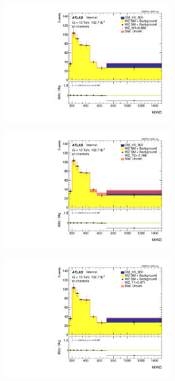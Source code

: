\documentclass[../Bachelorarbeit.tex]{subfiles}
\begin{document}
\begin{figure}[h]
\begin{subfigure}{0.35\textwidth}
        \includegraphics[width=\textwidth]{Plots/ALL_MWZ_right_color/GM_H5_900/M1/2022-05-07/VBSSR/all_VV_MWZ_vbs.pdf}
    \end{subfigure}
    \begin{subfigure}{0.35\textwidth}
        \includegraphics[width=\textwidth]{Plots/ALL_MWZ_right_color/GM_H5_900/T0/2022-05-07/VBSSR/all_VV_MWZ_vbs.pdf}
    \end{subfigure}
    \begin{subfigure}{0.35\textwidth}
        \includegraphics[width=\textwidth]{Plots/ALL_MWZ_right_color/GM_H5_900/T1/2022-05-07/VBSSR/all_VV_MWZ_vbs.pdf}

\end{subfigure}
\end{figure}
\end{document}

